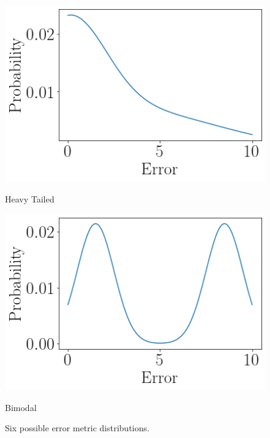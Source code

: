 \begin{figure}[ht]
\begin{minipage}[b]{0.5\linewidth}
        \includegraphics[width=\linewidth]{./img/distributions/heavy_tailed_2.png}
        \caption{Heavy Tailed}
        \vspace{4ex}
        \label{heavy_tailed_distributions}
    \end{minipage}%
    \begin{minipage}[b]{0.5\linewidth}
        \centering
        \includegraphics[width=\linewidth]{./img/distributions/twin_peaks.png}
        \caption{Bimodal}
        \label{bimodal_distribution}
        \vspace{4ex}
    \end{minipage}
    \caption{Six possible error metric distributions.}
    \label{fig:error_metric_distributions}
\end{figure}
